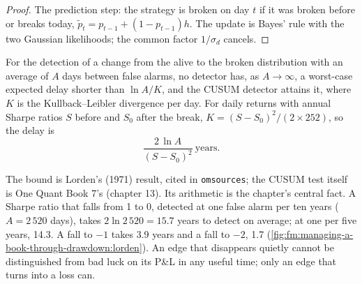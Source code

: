 \begin{proof}
The prediction step: the strategy is broken on day $t$ if it was broken before or breaks today, $\tilde p_t=p_{t-1}+(1-p_{t-1})h$. The update is
Bayes' rule with the two Gaussian likelihoods; the common factor $1/\sigma_d$ cancels.
\end{proof}

\begin{proposition}\label{prop:fm:managing-a-book-through-drawdown:lorden}
For the detection of a change from the alive to the broken distribution with an average of $A$ days between false alarms, no detector has, as
$A\to\infty$, a worst-case expected delay shorter than $\ln A/K$, and the CUSUM detector attains it, where $K$ is the Kullback--Leibler divergence
per day. For daily returns with annual Sharpe ratios $S$ before and $S_0$ after the break, $K=(S-S_0)^2/(2\times252)$, so the delay is
\[
\frac{2\,\ln A}{(S-S_0)^2}\ \text{years}.
\]
\end{proposition}

\admitted

The bound is Lorden's (1971) result, cited in \texttt{omsources}; the CUSUM test itself is One Quant Book 7's (chapter 13). Its arithmetic is the
chapter's central fact. A Sharpe ratio that falls from 1 to 0, detected at one false alarm per ten years ($A=2\,520$ days), takes
$2\ln2\,520=15.7$ years to detect on average; at one per five years, 14.3. A fall to $-1$ takes 3.9 years and a fall to $-2$, 1.7
(\cref{fig:fm:managing-a-book-through-drawdown:lorden}). An edge that disappears quietly cannot be distinguished from bad luck on its P\&L in any
useful time; only an edge that turns into a loss can.

\begin{omfigure}

\label{fig:fm:managing-a-book-through-drawdown:lorden}
\end{omfigure}

